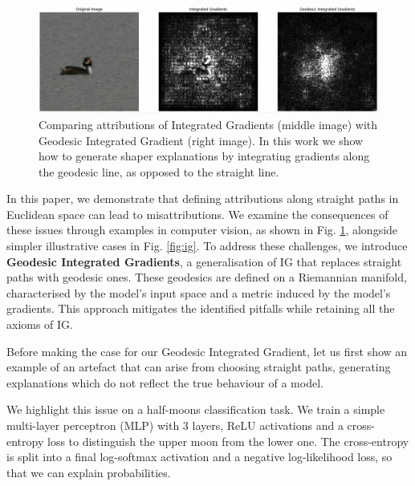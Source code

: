 \begin{figure}[t!]
	\begin{center}
		\centerline{\includegraphics[width=0.95\columnwidth]{figures/voc_compare.png}}
		\caption{Comparing attributions of Integrated Gradients (middle image) with Geodesic Integrated Gradient (right image). In this work we show how to generate shaper explanations by integrating gradients along the geodesic line, as opposed to the straight line.}
		\label{fig:puppy}
	\end{center}
	\vskip -0.3in
\end{figure}

In this paper, we demonstrate that defining attributions along straight paths in Euclidean space can lead to misattributions. We examine the consequences of these issues through examples in computer vision, as shown in Fig. \ref{fig:puppy}, alongside simpler illustrative cases in Fig. \ref{fig:ig}. To address these challenges, we introduce \textbf{Geodesic Integrated Gradients}, a generalisation of IG that replaces straight paths with geodesic ones. These geodesics are defined on a Riemannian manifold, characterised by the model's input space and a metric induced by the model's gradients. This approach mitigates the identified pitfalls while retaining all the axioms of IG.

Before making the case for our Geodesic Integrated Gradient, let us first show an example of an artefact that can arise from choosing straight paths, generating explanations which do not reflect the true behaviour of a model. 

We highlight this issue on a half-moons classification task. We train a simple multi-layer perceptron (MLP) with 3 layers, ReLU activations and a cross-entropy loss to distinguish the upper moon from the lower one. The cross-entropy is split into a final log-softmax activation and a negative log-likelihood loss, so that we can explain probabilities.

